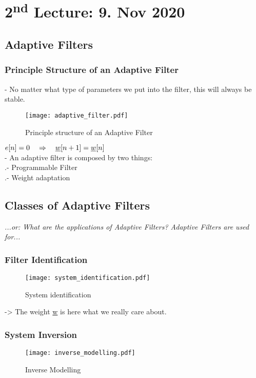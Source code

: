 \section{2\textsuperscript{nd} Lecture: 9. Nov 2020}

\subsection{Adaptive Filters}

\subsubsection{Principle Structure of an Adaptive Filter}

- No matter what type of parameters we put into the filter, this will always be stable.

\begin{figure}[H]
	\centering
	\texttt{[image: adaptive\_filter.pdf]}
	\caption{Principle structure of an Adaptive Filter}
	\label{adaptive_filter} 
\end{figure}


$e[n] = 0 \quad\Rightarrow\quad \underline{w} [n+1] = \underline{w} [n]$\\

- An adaptive filter is composed by two things:\\
\null{}.- Programmable Filter\\
\null{}.- Weight adaptation\\

\subsection{Classes of Adaptive Filters}
\textit{...or: What are the applications of Adaptive Filters? Adaptive Filters are used for...}

\subsubsection{Filter Identification} 
	\begin{figure}[H]
		\centering
		\texttt{[image: system\_identification.pdf]}
		\caption{System identification}
		\label{system_identification} 
	\end{figure}

-> The weight \underline{w} is here what we really care about.


\subsubsection{System Inversion}
\begin{figure}[H]
	\centering
	\texttt{[image: inverse\_modelling.pdf]}
	\caption{Inverse Modelling}
	\label{inversemodelling} 
\end{figure}

